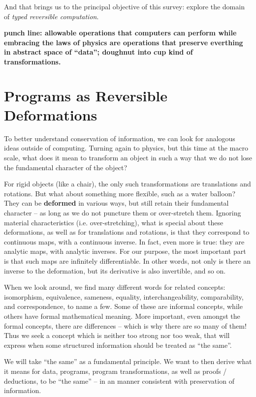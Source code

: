 \documentclass{article}
\begin{document}
And that brings us to the principal objective of this survey: explore the
domain of \emph{typed reversible computation}.

\textbf{punch line: allowable operations that computers can perform
  while embracing the laws of physics are operations that preserve
  everthing in abstract space of ``data''; doughnut into cup kind of
  transformations.}

\section{Programs as Reversible Deformations} 

To better understand conservation of information, we can look
for analogous ideas outside of computing. Turning again to physics,
but this time at the macro scale, what does it mean to transform an
object in such a way that we do not lose the fundamental character
of the object?

For rigid objects (like a chair), the only such transformations are
translations and rotations. But what about something more flexible,
such as a water balloon?  They can be \textbf{deformed} in various ways,
but still retain their fundamental character -- as long as we do not
puncture them or over-stretch them. Ignoring material characteristics
(i.e. over-stretching), what is special about these deformations, as well
as for translations and rotations, is that they correspond to
continuous maps, with a continuous inverse. In fact, even more is
true: they are analytic maps, with analytic inverses. For our purpose,
the most important part is that such maps are infinitely differentiable.
In other words, not only is there an inverse to the deformation, but
its derivative is also invertible, and so on.

When we look around, we find many different words for related
concepts: isomorphism, equivalence, sameness, equality, interchangeability,
comparability, and correspondence, to name a few. Some of these
are informal concepts, while others have formal mathematical meaning.
More important, even amongst the formal concepts, there are differences
-- which is why there are so many of them! Thus we seek a concept
which is neither too strong nor too weak, that will express when
some structured information should be treated as ``the same''.

We will take ``the same'' as a fundamental principle. We want
to then derive what it means for data, programs, program
transformations, as well as proofs / deductions, to be ``the
same'' -- in an manner consistent with preservation of 
information.
\end{document}

